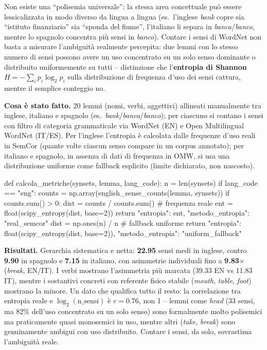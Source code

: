 \documentclass[11pt,a4paper]{article}
\begin{document}
\begin{theorybox}
Non esiste una ``polisemia universale'': la stessa area concettuale può essere lessicalizzata in modo diverso da lingua a lingua (es.\ l'inglese \textit{bank} copre sia ``istituto finanziario'' sia ``sponda del fiume'', l'italiano li separa in \textit{banca}/\textit{banco}, mentre lo spagnolo concentra più sensi in \textit{banco}). Contare i sensi di WordNet non basta a misurare l'ambiguità realmente percepita: due lemmi con lo stesso numero di sensi possono avere un uso concentrato su un solo senso dominante o distribuito uniformemente su tutti -- distinzione che l'\textbf{entropia di Shannon} $H=-\sum_i p_i\log_2 p_i$ sulla distribuzione di frequenza d'uso dei sensi cattura, mentre il semplice conteggio no.
\end{theorybox}

\textbf{Cosa è stato fatto.} 20 lemmi (nomi, verbi, aggettivi) allineati manualmente tra inglese, italiano e spagnolo (es.\ \textit{bank}/\textit{banca}/\textit{banco}); per ciascuno si contano i sensi con filtro di categoria grammaticale via WordNet (EN) e Open Multilingual WordNet (IT/ES). Per l'inglese l'entropia è calcolata dalle frequenze d'uso reali in SemCor (quante volte ciascun senso compare in un corpus annotato); per italiano e spagnolo, in assenza di dati di frequenza in OMW, si usa una distribuzione uniforme come fallback esplicito (limite dichiarato, non nascosto).

\begin{pylisting}[title={Entropia reale (SemCor) per l'inglese, fallback uniforme per IT/ES}]
def calcola_metriche(synsets, lemma, lang_code):
    n = len(synsets)
    if lang_code == "eng":
        counts = np.array(english_sense_counts(lemma, synsets))
        if counts.sum() > 0:
            dist = counts / counts.sum()          # frequenza reale
            ent = float(scipy_entropy(dist, base=2))
            return {"entropia": ent, "metodo_entropia": "real_semcor"}
    dist = np.ones(n) / n                          # fallback uniforme
    return {"entropia": float(scipy_entropy(dist, base=2)),
            "metodo_entropia": "uniform_fallback"}
\end{pylisting}

\textbf{Risultati.} Gerarchia sistematica e netta: \textbf{22.95} sensi medi in inglese, contro \textbf{9.90} in spagnolo e \textbf{7.15} in italiano, con asimmetrie individuali fino a \textbf{9.83$\times$} (\textit{break}, EN/IT). I verbi mostrano l'asimmetria più marcata (39.33 EN vs 11.83 IT), mentre i sostantivi concreti con referente fisico stabile (\textit{mouth}, \textit{table}, \textit{foot}) mostrano la minore. Un dato che qualifica tutto il resto: la correlazione tra entropia reale e $\log_2(\text{n\_sensi})$ è $r=0.76$, non 1 -- lemmi come \textit{head} (33 sensi, ma 82\% dell'uso concentrato su un solo senso) sono formalmente molto polisemici ma praticamente quasi monosemici in uso, mentre altri (\textit{take}, \textit{break}) sono genuinamente ambigui con uso distribuito. Contare i sensi, da solo, sovrastima l'ambiguità reale.
\end{document}
